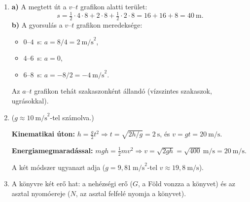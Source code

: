 \documentclass[11pt,a4paper]{article}
\begin{document}
\begin{enumerate}[leftmargin=*,label=\textbf{\arabic*.},itemsep=9pt,topsep=0pt,parsep=0pt]
\item
\begin{minipage}[t]{0.52\linewidth}
\textbf{a)} A megtett út a $v$--$t$ grafikon alatti terület:
\[
  s = \tfrac12\cdot 4\cdot 8 + 2\cdot 8 + \tfrac12\cdot 2\cdot 8
    = 16 + 16 + 8 = 40~\text{m}.
\]
\textbf{b)} A gyorsulás a $v$--$t$ grafikon meredeksége:
\begin{itemize}[nosep,leftmargin=1.5em]
  \item $0$--$4$~s: $a = 8/4 = 2~\text{m/s}^2$,
  \item $4$--$6$~s: $a = 0$,
  \item $6$--$8$~s: $a = -8/2 = -4~\text{m/s}^2$.
\end{itemize}
Az $a$--$t$ grafikon tehát szakaszonként állandó (vízszintes szakaszok, ugrásokkal).
\end{minipage}\hfill
\begin{minipage}[t]{0.44\linewidth}
\vspace{0pt}
\centering
{}
\end{minipage}

\item ($g \approx 10~\text{m/s}^2$-tel számolva.)

\textbf{Kinematikai úton:} $h = \tfrac{g}{2}t^2 \Rightarrow t = \sqrt{2h/g} = 2~\text{s}$,
és $v = gt = 20~\text{m/s}$.

\textbf{Energiamegmaradással:} $mgh = \tfrac12 mv^2 \Rightarrow
v = \sqrt{2gh} = \sqrt{400}~\text{m/s} = 20~\text{m/s}$.

A két módszer ugyanazt adja ($g = 9{,}81~\text{m/s}^2$-tel $v \approx 19{,}8~\text{m/s}$).

\item A könyvre két erő hat: a nehézségi erő ($G$, a Föld vonzza a könyvet) és az asztal
nyomóereje ($N$, az asztal felfelé nyomja a könyvet).


\end{enumerate}
\end{document}
